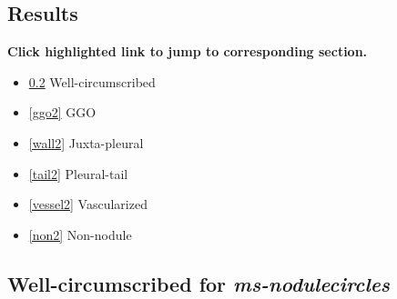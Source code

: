 \documentclass[onecolumn]{IEEEtran}
\begin{document}
\subsection{Results}
\textbf{Click highlighted link to jump to corresponding section.}
\begin{itemize}
\item \ref{iso2} Well-circumscribed
\item \ref{ggo2} GGO
\item \ref{wall2} Juxta-pleural
\item \ref{tail2} Pleural-tail
\item \ref{vessel2} Vascularized
\item \ref{non2} Non-nodule
\end{itemize}

\newpage
\subsection{Well-circumscribed for \emph{ms-nodulecircles}}
\label{iso2}
\begin{figure}[H]
 \centering
{}
\hspace{.1in}
\end{figure}
\end{document}
